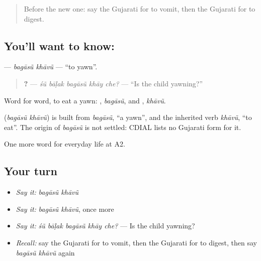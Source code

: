 \label{lesson:GU-C225-bagasu-khavu}



\begin{quote}
Before the new one: say the Gujarati for to vomit, then the Gujarati for to digest.
\end{quote}

\subsection*{You'll want to know:  }
\textbf{ } — \emph{bagāsũ khāvũ} — \textquotedblleft{}to yawn\textquotedblright{}.

\begin{quote}
\textbf{    ?} — \emph{śũ bāḷak bagāsũ khāy che?} — \textquotedblleft{}Is the child yawning?\textquotedblright{}
\end{quote}

Word for word, to eat a yawn: \textbf{}, \emph{bagāsũ}, and \textbf{}, \emph{khāvũ}.

\begin{cousinweb}
\textbf{ } (\emph{bagāsũ khāvũ}) is built from \emph{bagāsũ}, \textquotedblleft{}a yawn\textquotedblright{}, and the inherited verb \emph{khāvũ}, \textquotedblleft{}to eat\textquotedblright{}. The origin of \emph{bagāsũ} is not settled: CDIAL lists no Gujarati form for it.
\end{cousinweb}

\begin{grammarlens}[title={What you've built}]
One more word for everyday life at A2.
\end{grammarlens}

\subsection*{Your turn}
\begin{itemize}
\raggedright
  \item \emph{Say it:} \emph{bagāsũ khāvũ}
  \item \emph{Say it:} \emph{bagāsũ khāvũ}, once more
  \item \emph{Say it:} \emph{śũ bāḷak bagāsũ khāy che?} — Is the child yawning?
  \item \emph{Recall:} say the Gujarati for to vomit, then the Gujarati for to digest, then say \emph{bagāsũ khāvũ} again
\end{itemize}


